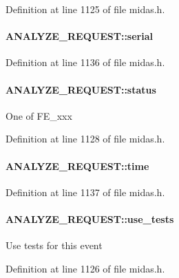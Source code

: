 Definition at line 1125 of file midas.h.
\paragraph[{serial}]{ {\bf ANALYZE\_\-REQUEST::serial}}\hfill\label{structANALYZE__REQUEST_a8eb5dfa05ce631ead9382cdafc82c8df}


Definition at line 1136 of file midas.h.
\paragraph[{status}]{ {\bf ANALYZE\_\-REQUEST::status}}\hfill\label{structANALYZE__REQUEST_af8540a32d1515c676b0d052fd03125d0}
One of FE\_\-xxx 

Definition at line 1128 of file midas.h.
\paragraph[{time}]{ {\bf ANALYZE\_\-REQUEST::time}}\hfill\label{structANALYZE__REQUEST_a66d92551c9b1ce76463d4d5da7facafb}


Definition at line 1137 of file midas.h.
\paragraph[{use\_\-tests}]{ {\bf ANALYZE\_\-REQUEST::use\_\-tests}}\hfill\label{structANALYZE__REQUEST_a08306810e609b1e3854d3e19abe3a919}
Use tests for this event 

Definition at line 1126 of file midas.h.